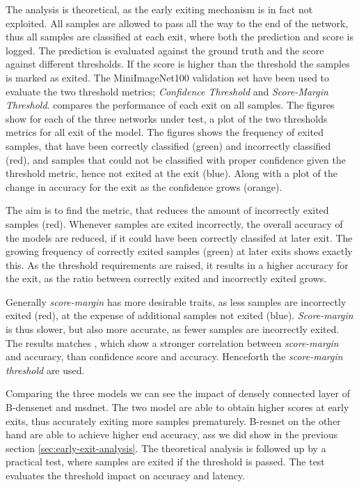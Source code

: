 The analysis is theoretical, as the early exiting mechanism is in fact not exploited. All samples are allowed to pass all the way to the end of the network, thus all samples are classified at each exit, where both the prediction and score is logged. The prediction is evaluated against the ground truth and the score against different thresholds. If the score is higher than the threshold the samples is marked as exited. The MiniImageNet100 validation set have been used to evaluate the two threshold metrics; \emph{Confidence Threshold} and \emph{Score-Margin Threshold}.  compares the performance of each exit on all samples. The figures show for each of the three networks under test, a plot of the two thresholds metrics for all exit of the model. The figures shows the frequency of exited samples, that have been correctly classified ({\color{sns-green}green}) and incorrectly classified ({\color{sns-red}red}), and samples that could not be classified with proper confidence given the threshold metric, hence not exited at the exit ({\color{sns-blue}blue}). Along with a plot of the change in accuracy for the exit as the confidence grows ({\color{sns-orange}orange}).  

The aim is to find the metric, that reduces the amount of incorrectly exited samples ({\color{sns-red}red}). Whenever samples are exited incorrectly, the overall accuracy of the models are reduced, if it could have been correctly classifed at later exit. The growing frequency of correctly exited samples ({\color{sns-green}green}) at later exits shows exactly this. As the threshold requirements are raised, it results in a higher accuracy for the exit, as the ratio between correctly exited and incorrectly exited grows. 

Generally \emph{score-margin} has more desirable traits, as less samples are incorrectly exited ({\color{sns-red}red}), at the expense of additional samples not exited ({\color{sns-blue}blue}). \emph{Score-margin} is thus slower, but also more accurate, as fewer samples are incorrectly exited. The results matches \cite{park_big/little_2015}, which show a stronger correlation between \emph{score-margin} and accuracy, than confidence score and accuracy. Henceforth the \emph{score-margin threshold} are used.

Comparing the three models we can see the impact of densely connected layer of B-\gls{densenet} and \gls{msdnet}. The two model are able to obtain higher scores at early exits, thus accurately exiting more samples prematurely. B-\gls{resnet} on the other hand are able to achieve higher end accuracy, ass we did show in the previous section \ref{sec:early-exit-analysis}. The theoretical analysis is followed up by a practical test, where samples are exited if the threshold is passed. The test evaluates the threshold impact on accuracy and latency. 


